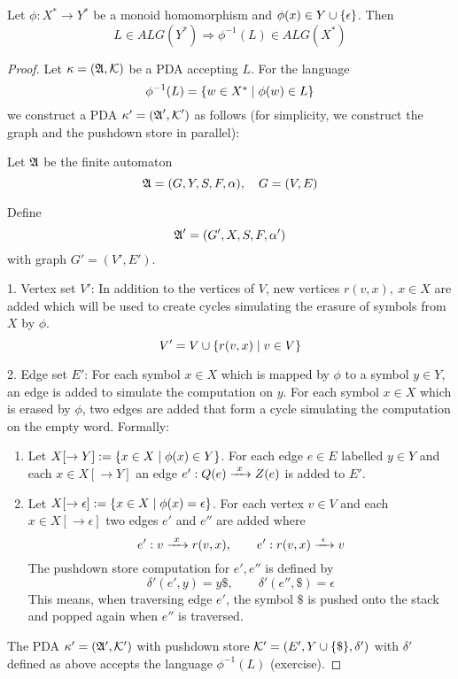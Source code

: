 \bigskip
\begin{theorem}
\label{alg-lang-closure-inv-hom}
Let $\phi : X^* \to Y^*$ be a monoid homomorphism and $\phi(x) \in Y \cup
\mbox{$\{\epsilon\}$}$. Then
\[ L \in ALG(Y^*) \Rightarrow \phi^{-1}(L) \in ALG(X^*) \]
\end{theorem}


\begin{proof}
Let $\kappa = (\mbox{$\mathfrak{A}$}, \mbox{$\mathcal{K}$})$ be a PDA accepting $L$. For the language
\[ \phi^{-1}(L) = \mbox{$\{w \in X^* \mid \phi(w) \in L\}$} \]
we construct a PDA $\kappa' = (\mbox{$\mathfrak{A}$}', \mbox{$\mathcal{K}$}')$ as follows (for
simplicity, we construct the graph and the pushdown store in parallel):

Let $\mbox{$\mathfrak{A}$}$ be the finite automaton
\[ \mbox{$\mathfrak{A}$} = (G, Y, S, F, \alpha),\quad G = (V, E) \]

Define
\[ \mbox{$\mathfrak{A}$}' = (G', X, S, F, \alpha') \]
with graph $G' = (V', E')$.

1. Vertex set $V'$: In addition to the vertices of $V$, new vertices $r(v, x),\
x \in X$ are added which will be used to create cycles simulating the erasure of
symbols from $X$ by $\phi$.
\[ V' = V \cup \mbox{$\{r(v,x) \mid v \in V\}$} \]

2. Edge set $E'$: For each symbol $x \in X$ which is mapped by $\phi$ to a 
symbol $y \in Y$, an edge is added to simulate the computation on $y$.
For each symbol $x \in X$ which is erased by $\phi$, two edges are added that
form a cycle simulating the computation on the empty word. Formally:

\begin{enumerate}
  \item Let $X[\to Y] := \mbox{$\{x \in X \mid \phi(x) \in Y\}$}$. For each edge
  $e \in E$ labelled $y \in Y$ and each $x \in X[\to Y]$ an edge $e': Q(e)
  \xrightarrow{\ {x}\ } Z(e)$ is added to $E'$.
  
  \item Let $X[\to \epsilon] := \mbox{$\{x \in X \mid \phi(x) = \epsilon\}$}$. For
  each vertex $v  \in V$ and each $x \in X[\to \epsilon]$ two edges $e'$ and
  $e''$ are added where
  \[ e': v \xrightarrow{\ {x}\ } r(v,x),\qquad e': r(v,x) \xrightarrow{\ {\epsilon}\ } v \]
  The pushdown store computation for $e', e''$ is defined by
  \[ \delta'(e', y) = y \$,\qquad \delta'(e'', \$) = \epsilon \]
  This means, when traversing edge $e'$, the symbol ${\$}$ is pushed onto the
  stack and popped again when $e''$ is traversed.
\end{enumerate}

The PDA $\kappa' = (\mbox{$\mathfrak{A'}$}, \mbox{$\mathcal{K'}$})$ with pushdown store
$\mbox{$\mathcal{K'}$} = (E', Y \cup \mbox{$\{\$\}$}, \delta')$ with $\delta'$ defined as
above accepts the language $\phi^{-1}(L)$ (exercise).
\end{proof}

